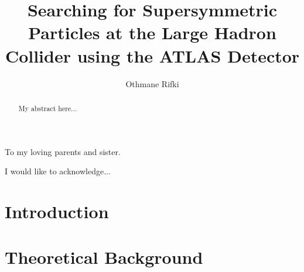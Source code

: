 \documentclass{outhesis}
\begin{document}
\author{Othmane Rifki}
\title{Searching for Supersymmetric Particles at the Large Hadron Collider using the ATLAS Detector}
\address{Norman, Oklahoma}

\begin{dedication}
  To my loving parents and sister.
\end{dedication}

\begin{acknowledgements}
  I would like to acknowledge...
\end{acknowledgements}


\begin{abstract}
My abstract here...
\end{abstract}


\frontmatter

\maketitle

\mainmatter


\chapter*{Introduction}\label{sec:intro}


\chapter{Theoretical Background}\label{sec:theory}

\end{document}
